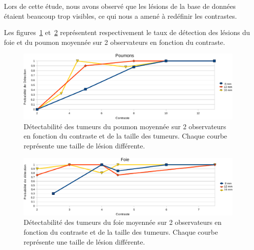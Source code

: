 Lors de cette étude, nous avons observé que les lésions de la base de données étaient beaucoup trop visibles, ce qui nous a amené à redéfinir les contrastes. 


Les figures~\ref{fig:calibration} et~\ref{fig:calibrationFoie}  représentent respectivement le taux de détection des lésions du foie et du poumon moyennée sur 2 observateurs en fonction du contraste.


\begin{figure}[h!]
\begin{center}
\includegraphics[width=15cm]{images/calibration_crop}
\end{center}
\caption[Détectabilité des tumeurs du poumon en fonction du contraste et de la taille des tumeurs]{Détectabilité des tumeurs du poumon moyennée sur 2 observateurs en fonction du contraste et de la taille des tumeurs. Chaque courbe représente une taille de lésion différente.} 
\label{fig:calibration}
\end{figure}

\begin{figure}[h!]
\begin{center}
\includegraphics[width=15cm]{images/calibrationFoie_crop}
\end{center}
\caption[Détectabilité des tumeurs du foie en fonction du contraste et de la taille des tumeurs]{Détectabilité des tumeurs du foie moyennée sur 2 observateurs en fonction du contraste et de la taille des tumeurs. Chaque courbe représente une taille de lésion différente.} 
\label{fig:calibrationFoie}
\end{figure}




